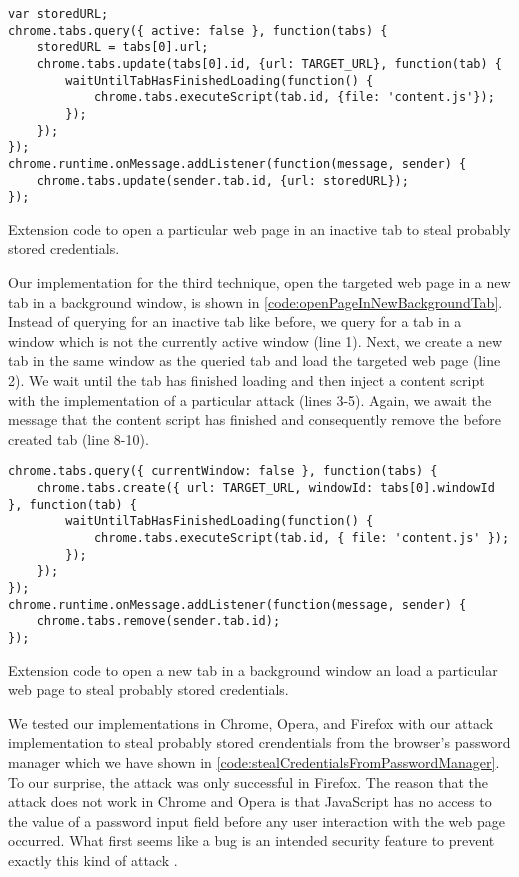 	\begin{code}
		\begin{lstlisting}
var storedURL;
chrome.tabs.query({ active: false }, function(tabs) {	
	storedURL = tabs[0].url;
	chrome.tabs.update(tabs[0].id, {url: TARGET_URL}, function(tab) {
		waitUntilTabHasFinishedLoading(function() {
			chrome.tabs.executeScript(tab.id, {file: 'content.js'});	
		});
	});
});
chrome.runtime.onMessage.addListener(function(message, sender) {
	chrome.tabs.update(sender.tab.id, {url: storedURL});
});
\end{lstlisting}
		\caption{Extension code to open a particular web page in an inactive tab to steal probably stored credentials.}
		\label{code:openPageInInactiveTab}
	\end{code}
	
	Our implementation for the third technique, open the targeted web page in a new tab in a background window, is shown in \autoref{code:openPageInNewBackgroundTab}. Instead of querying for an inactive tab like before, we query for a tab in a window which is not the currently active window (line 1). Next, we create a new tab in the same window as the queried tab and load the targeted web page (line 2). We wait until the tab has finished loading and then inject a content script with the implementation of a particular attack (lines 3-5). Again, we await the message that the content script has finished and consequently remove the before created tab (line 8-10).

	\begin{code}
		\begin{lstlisting}
chrome.tabs.query({ currentWindow: false }, function(tabs) {	
	chrome.tabs.create({ url: TARGET_URL, windowId: tabs[0].windowId },	function(tab) {
		waitUntilTabHasFinishedLoading(function() {
			chrome.tabs.executeScript(tab.id, { file: 'content.js' });	
		});
	});
});
chrome.runtime.onMessage.addListener(function(message, sender) {
	chrome.tabs.remove(sender.tab.id);
});
\end{lstlisting}
		\caption{Extension code to open a new tab in a background window an load a particular web page to steal probably stored credentials.}
		\label{code:openPageInNewBackgroundTab}
	\end{code}
			
	We tested our implementations in Chrome, Opera, and Firefox with our attack implementation to steal probably stored crendentials from the browser's password manager which we have shown in \autoref{code:stealCredentialsFromPasswordManager}. To our surprise, the attack was only successful in Firefox. The reason that the attack does not work in Chrome and Opera is that JavaScript has no access to the value of a password input field before any user interaction with the web page occurred. What first seems like a bug is an intended security feature to prevent exactly this kind of attack \cite{chromiumBlogPasswordInput}.


